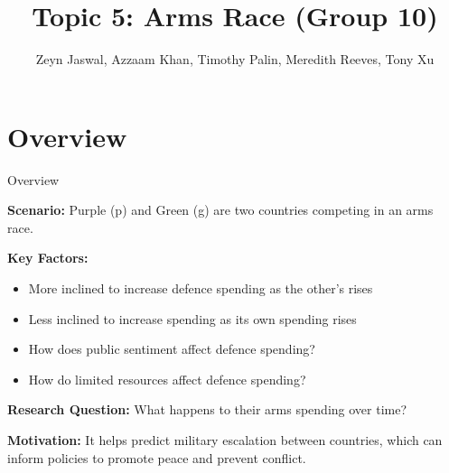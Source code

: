 \documentclass[11pt]{beamer}
\title[Topic 5: Arms Race]{Topic 5: Arms Race (Group 10)}
\author[Jaswal, Khan, Palin, Reeves, and Xu]{Zeyn Jaswal, Azzaam Khan, Timothy Palin, Meredith Reeves, Tony Xu}
\date{}
\begin{document}
\maketitle

\section{Overview}
\begin{frame}{Overview}
    
    \textbf{Scenario:} Purple (p) and Green (g) are two countries competing in an arms race.

   \vspace{0.3cm} 

    \textbf{Key Factors:}
    \begin{itemize}
        \item More inclined to increase defence spending as the other's rises
        \item Less inclined to increase spending as its own spending rises
        \item How does public sentiment affect defence spending?
        \item How do limited resources affect defence spending?
    \end{itemize}

\vspace{0.3cm}

    \textbf{Research Question:} What happens to their arms spending over time? 

\vspace{0.3cm}
    \textbf{Motivation:} It helps predict military escalation between countries, which can inform policies to promote peace and prevent conflict.

\end{frame}

\end{document}
